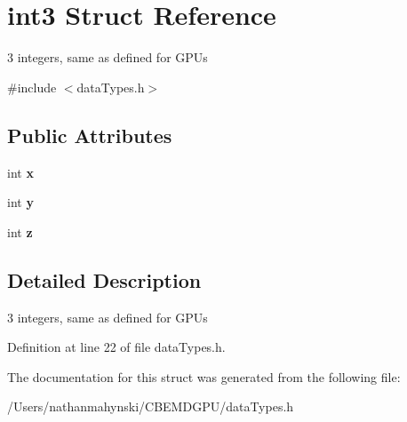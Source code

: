 \hypertarget{structint3}{\section{int3 Struct Reference}
\label{structint3}
}


3 integers, same as defined for G\-P\-Us  




{\ttfamily \#include $<$data\-Types.\-h$>$}

\subsection*{Public Attributes}
\begin{DoxyCompactItemize}
\item 
\hypertarget{structint3_a0a4ad50a155a35fa938ce6f16930affa}{int {\bfseries x}}\label{structint3_a0a4ad50a155a35fa938ce6f16930affa}

\item 
\hypertarget{structint3_a5d95e23491677d61019f0354b16adca9}{int {\bfseries y}}\label{structint3_a5d95e23491677d61019f0354b16adca9}

\item 
\hypertarget{structint3_a5cd5a3c388fa28814e3496ef07c39360}{int {\bfseries z}}\label{structint3_a5cd5a3c388fa28814e3496ef07c39360}

\end{DoxyCompactItemize}


\subsection{Detailed Description}
3 integers, same as defined for G\-P\-Us 

Definition at line 22 of file data\-Types.\-h.



The documentation for this struct was generated from the following file\-:\begin{DoxyCompactItemize}
\item 
/\-Users/nathanmahynski/\-C\-B\-E\-M\-D\-G\-P\-U/data\-Types.\-h\end{DoxyCompactItemize}
